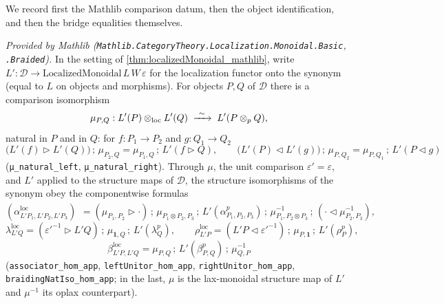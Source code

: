 We record first the Mathlib comparison datum, then the object identification, and
then the bridge equalities themselves.

\begin{lemma}
  \label{lem:localizationMonoidal_mu_mathlib}
  \mathlibok
  \textit{Provided by Mathlib
  (\texttt{Mathlib.CategoryTheory.Localization.Monoidal.Basic},
  \texttt{.Braided}).}
  In the setting of \cref{thm:localizedMonoidal_mathlib}, write
  \(L' : \mathcal{D} \to \mathrm{LocalizedMonoidal}\,L\,W\,\varepsilon\) for the
  localization functor onto the synonym (equal to \(L\) on objects and
  morphisms). For objects \(P, Q\) of \(\mathcal{D}\) there is a comparison
  isomorphism
  \[
    \mu_{P,Q} : L'(P) \mathbin{\otimes_{\mathrm{loc}}} L'(Q)
      \;\xrightarrow{\ \sim\ }\; L'(P \otimes_p Q),
  \]
  natural in \(P\) and in \(Q\): for \(f : P_1 \to P_2\) and \(g : Q_1 \to Q_2\)
  \[
    \bigl(L'(f) \rhd L'(Q)\bigr) \,;\, \mu_{P_2,Q}
      = \mu_{P_1,Q} \,;\, L'(f \rhd Q),
    \qquad
    \bigl(L'(P) \lhd L'(g)\bigr) \,;\, \mu_{P,Q_2}
      = \mu_{P,Q_1} \,;\, L'(P \lhd g)
  \]
  (\texttt{μ\_natural\_left}, \texttt{μ\_natural\_right}). Through \(\mu\), the
  unit comparison \(\varepsilon' = \varepsilon\), and \(L'\) applied to the
  structure maps of \(\mathcal{D}\), the structure isomorphisms of the synonym
  obey the componentwise formulas
  \[
    (\alpha^{\mathrm{loc}}_{L'P_1, L'P_2, L'P_3})^{\phantom{1}}
      = (\mu_{P_1,P_2} \rhd \cdot)\,;\, \mu_{P_1 \otimes P_2, P_3}
        \,;\, L'(\alpha^p_{P_1,P_2,P_3})
        \,;\, \mu_{P_1, P_2 \otimes P_3}^{-1}
        \,;\, (\cdot \lhd \mu_{P_2,P_3}^{-1}),
  \]
  \[
    \lambda^{\mathrm{loc}}_{L'Q}
      = (\varepsilon'^{-1} \rhd L'Q)\,;\, \mu_{\mathbf{1},Q}
        \,;\, L'(\lambda^p_Q),
    \qquad
    \rho^{\mathrm{loc}}_{L'P}
      = (L'P \lhd \varepsilon'^{-1})\,;\, \mu_{P,\mathbf{1}}
        \,;\, L'(\rho^p_P),
  \]
  \[
    \beta^{\mathrm{loc}}_{L'P, L'Q}
      = \mu_{P,Q} \,;\, L'(\beta^p_{P,Q}) \,;\, \mu_{Q,P}^{-1}
  \]
  (\texttt{associator\_hom\_app}, \texttt{leftUnitor\_hom\_app},
  \texttt{rightUnitor\_hom\_app}, \texttt{braidingNatIso\_hom\_app}; in the last,
  \(\mu\) is the lax-monoidal structure map of \(L'\) and \(\mu^{-1}\) its
  oplax counterpart).
\end{lemma}


